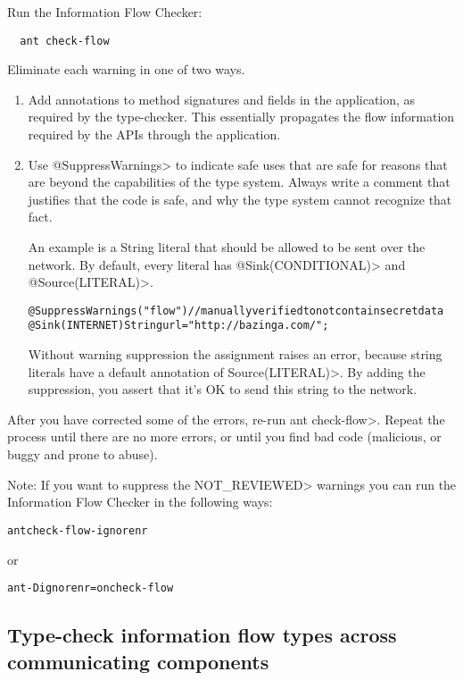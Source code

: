 Run the Information Flow Checker:

\begin{Verbatim}
  ant check-flow
\end{Verbatim}

Eliminate each warning in one of two ways.
\begin{enumerate}
\item Add annotations to method signatures and fields in the application, as
required by the type-checker. This essentially propagates the flow
information required by the APIs through the application.

\item Use \<@SuppressWarnings> to indicate safe uses that are safe for reasons
that are beyond the capabilities of the type system. Always write a
comment that justifies that the code is safe, and why the type system
cannot recognize that fact.

An example is a String literal that should be allowed to be sent
over the network. By default, every literal has \<@Sink(CONDITIONAL)> 
and \<@Source(LITERAL)>.

\begin{alltt}
    @SuppressWarnings("flow") // manually verified to not contain secret data
    @Sink(INTERNET) String url = "http://bazinga.com/";
\end{alltt}

Without warning suppression the assignment raises an error, because string literals
have a default annotation of \<Source(LITERAL)>. By adding the suppression, you
assert that it's OK to send this string to the network. 

\end{enumerate}

After you have corrected some of the errors, re-run \<ant check-flow>.
Repeat the process until there are no more errors, or until you find bad
code (malicious, or buggy and prone to abuse).

Note: If you want to suppress the \<NOT\_REVIEWED> warnings you can run the Information Flow Checker
in the following ways:

\begin{alltt}
    ant check-flow-ignorenr
\end{alltt}
or
\begin{alltt}
    ant -Dignorenr=on check-flow
\end{alltt}

\subsection{Type-check information flow types across communicating components}

